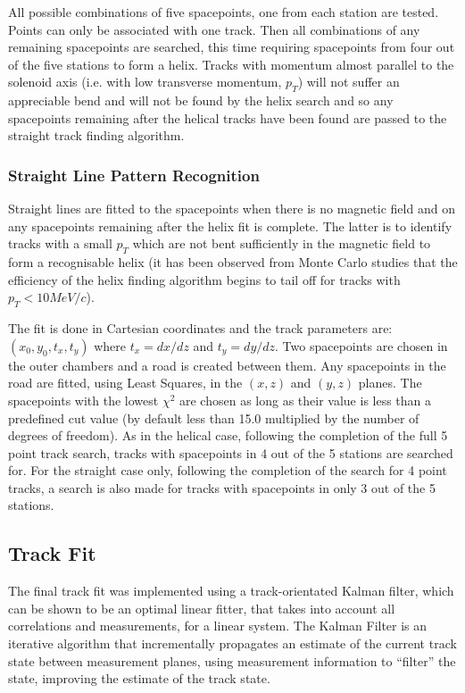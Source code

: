    All possible combinations of five spacepoints, one from each station are tested. Points can only be associated with one track. Then all combinations of any remaining spacepoints are searched, this time requiring spacepoints from four out of the five stations to form a helix. Tracks with momentum almost parallel to the solenoid axis (i.e. with low transverse momentum, $p_T$) will not suffer an appreciable bend and will not be found by the helix search and so any spacepoints remaining after the helical tracks have been found are passed to the straight track finding algorithm.

    \subsubsection{Straight Line Pattern Recognition}
    \label{subsubsec:StraightLinePatternRecognition}

    Straight lines are fitted to the spacepoints when there is no magnetic field and on any spacepoints remaining after the helix fit is complete. The latter is to identify tracks with a small $p_T$ which are not bent sufficiently in the magnetic field to form a recognisable helix (it has been observed from Monte Carlo studies that the efficiency of the helix finding algorithm begins to tail off for tracks with $p_T < 10 MeV/c$).

    The fit is done in Cartesian coordinates and the track parameters are: $(x_0, y_0, t_x, t_y)$ where $t_x = dx/dz$ and $t_y = dy/dz$. Two spacepoints are chosen in the outer chambers and a road is created between them. Any spacepoints in the road are fitted, using Least Squares, in the $(x,z)$ and $(y,z)$ planes. The spacepoints with the lowest $\chi^2$ are chosen as long as their value is less than a predefined cut value (by default less than 15.0 multiplied by the number of degrees of freedom). As in the helical case, following the completion of the full 5 point track search, tracks with spacepoints in 4 out of the 5 stations are searched for. For the straight case only, following the completion of the search for 4 point tracks, a search is also made for tracks with spacepoints in only 3 out of the 5 stations. 

   \subsection{Track Fit}
   \label{subsec:FinalTrackFit}
   The final track fit was implemented using a track-orientated Kalman filter\cite{Fruhwirth,Billoir}, which can be shown to be an optimal linear fitter, that takes into account all correlations and measurements, for a linear system. The Kalman Filter is an iterative algorithm that incrementally propagates an estimate of the current track state between measurement planes, using measurement information to ``filter'' the state, improving the estimate of the track state.
   
